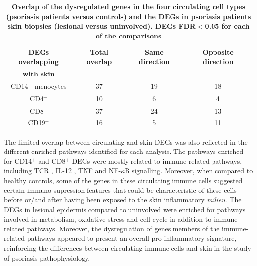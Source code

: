 \begin{table}[htbp]
\centering
\begin{tabular}{@{} c c c c}
\toprule
\textbf{DEGs overlapping}   & \textbf{Total overlap}   & \textbf{Same direction}  & \textbf{Opposite direction}\\
\textbf{with skin}          &                          &                          &                            \\
\midrule 
\midrule
CD14$^+$ monocytes          & 37                       & 19                       &  18                         \\ 
CD4$^+$                     & 10                       & 6                        &  4                           \\
CD8$^+$                     & 37                       & 24                       &  13                           \\
CD19$^+$                    & 16                       & 5                        &  11                          \\
\bottomrule 
\end{tabular}
\medskip %
\caption[Overlap of the dysregulated genes in the four circulating cell types (psoriasis patients versus controls) and the DEGs in psoriasis patients skin biopsies (lesional versus uninvolved).]{\textbf{Overlap of the dysregulated genes in the four circulating cell types (psoriasis patients versus controls) and the DEGs in psoriasis patients skin biopsies (lesional versus uninvolved). DEGs FDR$<$0.05 for each of the comparisons} }
\label{tab:RNAseq_overlap_circulating_versus_skin}
\end{table}
\bigskip %


The limited overlap between circulating and skin DEGs was also reflected in the different enriched pathways identified for each analysis. The pathways enriched for CD14$^+$ and CD8$^+$ DEGs were mostly related to immune-related pathways, including TCR , IL-12 , TNF and NF-$\kappa$B signalling. Moreover, when compared to healthy controls, some of the genes in these circulating immune cells suggested certain immuno-supression features that could be characteristic of these cells before or/and after having been exposed to the skin inflammatory \textit{milieu}. The DEGs in lesional epidermis compared to uninvolved were enriched for pathways involved in metabolism, oxidative stress and cell cycle in addition to immune-related pathways. Moreover, the dysregulation of genes members of the immune-related pathways appeared to present an overall pro-inflammatory signature, reinforcing the differences between circulating immune cells and skin in the study of psoriasis pathophysiology.


